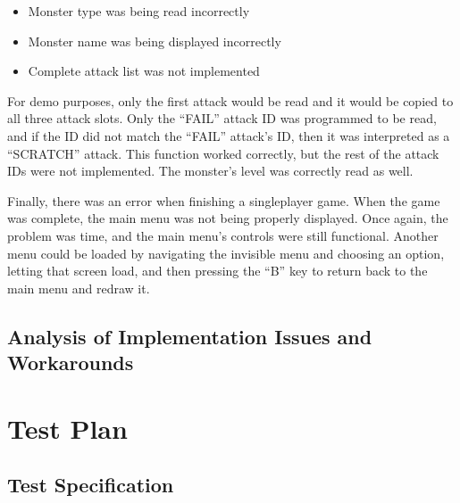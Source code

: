 \documentclass[12pt]{article} %
\begin{document}
\begin{itemize}
\begin{itemize}
	\item Monster type was being read incorrectly
	\item Monster name was being displayed incorrectly
	\item Complete attack list was not implemented
\end{itemize}

For demo purposes, only the first attack would be read and it would be copied
to all three attack slots.  Only the ``FAIL'' attack ID was programmed to be
read, and if the ID did not match the ``FAIL'' attack's ID, then it was
interpreted as a ``SCRATCH'' attack.  This function worked correctly, but the
rest of the attack IDs were not implemented.  The monster's level was correctly
read as well.

Finally, there was an error when finishing a singleplayer game.  When the game
was complete, the main menu was not being properly displayed.  Once again, the
problem was time, and the main menu's controls were still functional.  Another
menu could be loaded by navigating the invisible menu and choosing an option,
letting that screen load, and then pressing the ``B'' key to return back to the
main menu and redraw it.

\subsection{Analysis of Implementation Issues and Workarounds} %
%
%

\section{Test Plan } %
%

\subsection{Test Specification} %
%
%


\end{itemize}
\end{document}

